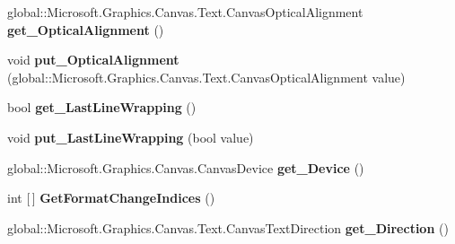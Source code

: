 \begin{DoxyCompactItemize}
\mbox{\label{interface_microsoft_1_1_graphics_1_1_canvas_1_1_text_1_1_i_canvas_text_layout_a6f53ec2716648f680f6930ed036d8ee3}} 
global\+::\+Microsoft.\+Graphics.\+Canvas.\+Text.\+Canvas\+Optical\+Alignment {\bfseries get\+\_\+\+Optical\+Alignment} ()
\item 
\mbox{\label{interface_microsoft_1_1_graphics_1_1_canvas_1_1_text_1_1_i_canvas_text_layout_a766a153760270ab2c01c112374543791}} 
void {\bfseries put\+\_\+\+Optical\+Alignment} (global\+::\+Microsoft.\+Graphics.\+Canvas.\+Text.\+Canvas\+Optical\+Alignment value)
\item 
\mbox{\label{interface_microsoft_1_1_graphics_1_1_canvas_1_1_text_1_1_i_canvas_text_layout_af335bf16dd7057ce2706ba964c165998}} 
bool {\bfseries get\+\_\+\+Last\+Line\+Wrapping} ()
\item 
\mbox{\label{interface_microsoft_1_1_graphics_1_1_canvas_1_1_text_1_1_i_canvas_text_layout_adeb3fc37708660c2d3ff7a49349a4f43}} 
void {\bfseries put\+\_\+\+Last\+Line\+Wrapping} (bool value)
\item 
\mbox{\label{interface_microsoft_1_1_graphics_1_1_canvas_1_1_text_1_1_i_canvas_text_layout_ac15a95c4a7796e189425d1953df24949}} 
global\+::\+Microsoft.\+Graphics.\+Canvas.\+Canvas\+Device {\bfseries get\+\_\+\+Device} ()
\item 
\mbox{\label{interface_microsoft_1_1_graphics_1_1_canvas_1_1_text_1_1_i_canvas_text_layout_a73f2d2dac663dc66cf5846e351b3ecb5}} 
int \mbox{[}$\,$\mbox{]} {\bfseries Get\+Format\+Change\+Indices} ()
\item 
\mbox{\label{interface_microsoft_1_1_graphics_1_1_canvas_1_1_text_1_1_i_canvas_text_layout_adcf04927cfc8f87ca62aed637107ecc8}} 
global\+::\+Microsoft.\+Graphics.\+Canvas.\+Text.\+Canvas\+Text\+Direction {\bfseries get\+\_\+\+Direction} ()

\end{DoxyCompactItemize}
